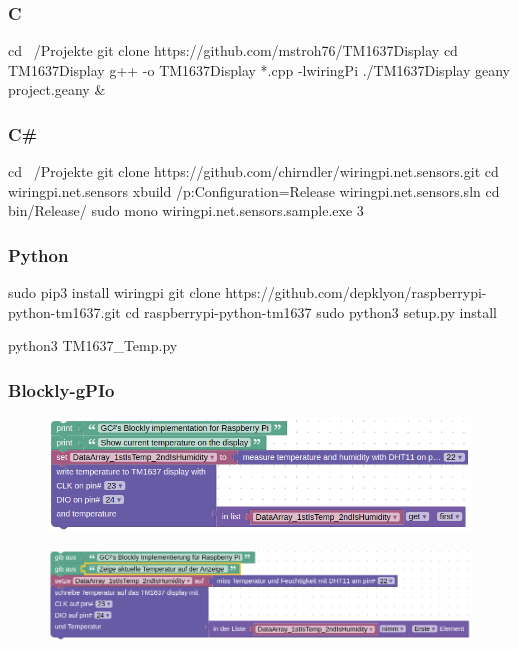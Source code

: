 \subsubsection{C}

\begin{console}
	cd ~/Projekte
	git clone https://github.com/mstroh76/TM1637Display
	cd TM1637Display
	g++ -o TM1637Display *.cpp -lwiringPi
	./TM1637Display
	geany project.geany & 
\end{console}


\subsubsection{C\#}

\begin{console}
	cd ~/Projekte
	git clone https://github.com/chirndler/wiringpi.net.sensors.git
	cd wiringpi.net.sensors
	xbuild /p:Configuration=Release wiringpi.net.sensors.sln
	cd bin/Release/
	sudo mono wiringpi.net.sensors.sample.exe 3
\end{console}


\clearpage
\subsubsection{Python}

\begin{console}
	sudo pip3 install wiringpi
	git clone https://github.com/depklyon/raspberrypi-python-tm1637.git
	cd raspberrypi-python-tm1637
	sudo python3 setup.py install
\end{console}

\lstset{language=Python, caption=, 
        label=TM1637Program, frame=single, basicstyle=\ttfamily
	      \footnotesize, breakatwhitespace=false, showstringspaces=false, 
        showtabs=false, tabsize=2 }


\begin{console}
	python3 TM1637_Temp.py
\end{console}


\subsubsection{Blockly-gPIo}

\begin{figure}[ht]
	\includegraphics[scale=0.44]{images/Blockly-gPIo_TM1637_EN.png}
	\label{Blockly-gPIo_TM1637}
\end{figure}

\hspace{20mm}
	
\begin{figure}[ht]
	\includegraphics[scale=0.44]{images/Blockly-gPIo_TM1637_DE.png}	
	\label{Blockly-gPIo_TM1637_DE}
\end{figure}